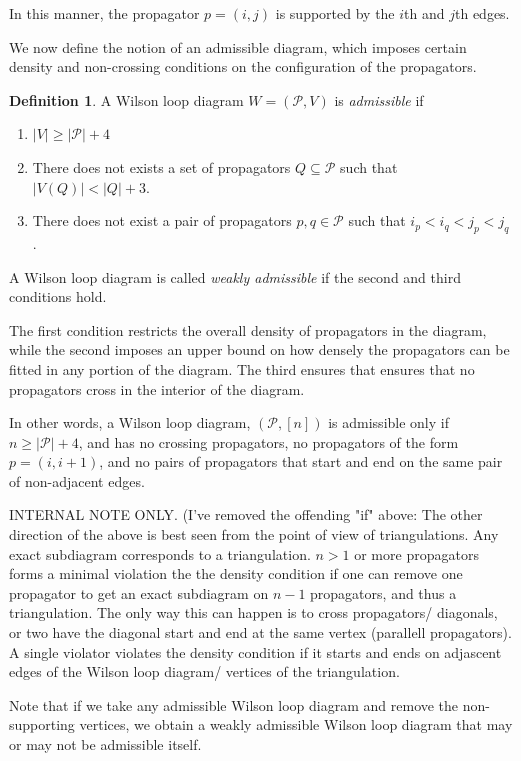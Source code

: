\documentclass[11pt]{article}
\newcommand{\cP}{\mathcal{P}}
\theoremstyle{remark}
\theoremstyle{definition}
\newtheorem{dfn}[thm]{Definition}
\begin{document}
In this manner, the propagator $p = (i, j)$ is supported by the $i$th and $j$th edges.

We now define the notion of an admissible diagram, which imposes certain density and non-crossing conditions on the configuration of the propagators.

\begin{dfn}\label{admisdfn}
A Wilson loop diagram $W = (\cP,V)$ is {\em admissible} if \begin{enumerate}
\item $|V| \geq |\cP| + 4$
\item There does not exists a set of propagators $Q \subseteq \cP$ such that $|V(Q)| < |Q| + 3$.
\item There does not exist a pair of propagators $p, q \in \cP$ such that $i_p < i_q < j_p <j_q$.
\end{enumerate}
A Wilson loop diagram is called {\em weakly admissible} if the second and third conditions hold.
 \end{dfn}

The first condition restricts the overall density of propagators in the diagram, while the second imposes an upper bound on how densely the propagators can be fitted in any portion of the diagram. The third ensures that ensures that no propagators cross in the interior of the diagram. 

In other words, a Wilson loop diagram, $(\cP, [n])$ is admissible only if $n \geq |\cP| +4$, and has no crossing propagators, no propagators of the form $p = (i, i+1)$, and no pairs of propagators that start and end on the same pair of non-adjacent edges.


{\color{violet} INTERNAL NOTE ONLY. (I've removed the offending "if" above: The other direction of the above is best seen from the point of view of triangulations. Any exact subdiagram corresponds to a triangulation. $n>1$ or more propagators forms a minimal violation the the density condition if one can remove one propagator to get an exact subdiagram on $n-1$ propagators, and thus a triangulation. The only way this can happen is to cross propagators/ diagonals, or two have the diagonal start and end at the same vertex (parallell propagators). A single violator violates the density condition if it starts and ends on adjascent edges of the Wilson loop diagram/ vertices of the triangulation.}

Note that if we take any admissible Wilson loop diagram and remove the non-supporting vertices, we obtain a weakly admissible Wilson loop diagram that may or may not be admissible itself.
\end{document}
